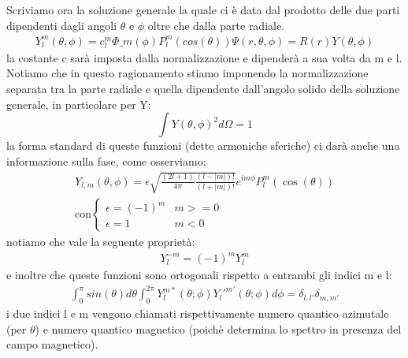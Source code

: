 Scriviamo ora la soluzione generale la quale ci è data dal prodotto delle due parti dipendenti dagli angoli $\theta$ e $\phi$ oltre che dalla parte radiale.
\begin{equation}\begin{split}
Y_{ l }^{ m }\left( \theta ,\phi  \right) =c_{ l }^{ m }\Phi \_ m\left( \phi  \right) P_{ l }^{ m }\left (cos(\theta ) \right) \Psi \left( r,\theta ,\phi  \right) =R\left( r \right) Y\left( \theta ,\phi  \right) 
\end{split}\end{equation}
la costante c sarà imposta dalla normalizzazione e dipenderà a sua volta da m e l. 
Notiamo che in questo ragionamento stiamo imponendo la normalizzazione separata tra la parte radiale e quella dipendente dall'angolo solido della soluzione generale, in particolare per Y: 
$$\int{Y\left(\theta,\phi\right)^2{d}\Omega}=1$$
la forma standard di queste funzioni (dette armoniche sferiche) ci darà anche una informazione sulla fase, come osserviamo:
\begin{equation}\begin{split}
Y_{l,m}\left(\theta,\phi\right)=\epsilon\sqrt{\frac{\left(2l+1\right)}{4\pi}\frac{\left(l-|m|\right)!}{\left(l+|m|\right)!}}e^{im\phi}P^m_l\left(\cos{\left(\theta\right)}\right)\\
\textrm{con} 
\begin{cases}
\epsilon=\left(-1\right)^m & m>=0\\
\epsilon=1 & m<0
\end{cases}
\end{split}\end{equation}
notiamo che vale la seguente proprietà:
\begin{equation}\begin{split}
Y_l^{-m}=\left(-1\right)^m Y_l^m
\end{split}\end{equation}
e inoltre che queste funzioni sono ortogonali rispetto a entrambi gli indici m e l: 
\begin{equation}\begin{split}
\int_0^\pi{sin(\theta)}{d}\theta\int_0^{2\pi}Y_l^{m*}\left(\theta;\phi\right)Y_l'^{m'}\left(\theta;\phi\right){d}\phi=\delta_{l,l'}\delta_{m,m'}
\end{split}\end{equation}
i due indici l e m vengono chiamati rispettivamente numero quantico azimutale (per $\theta$) e numero quantico magnetico (poichè determina lo spettro in presenza del campo magnetico).

%